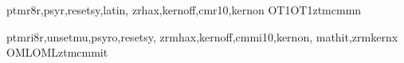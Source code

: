 





\installfonts
    {}
     {}

      {ptmr8r,psyr,resetsy,latin,%
       zrhax,kernoff,cmr10,kernon}
      {OT1}{OT1}{ztmcm}{m}{n}{}

      {ptmri8r,unsetmu,psyro,resetsy,%
       zrmhax,kernoff,cmmi10,kernon,%
       mathit,zrmkernx}
      {OML}{OML}{ztmcm}{m}{it}{}

